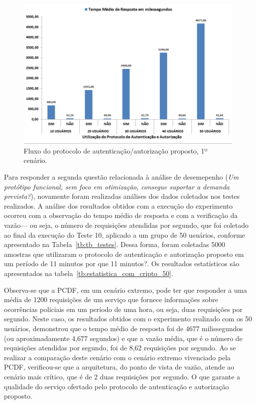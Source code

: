 \begin{figure}[!htb]
    \centering
    \includegraphics[width=1.0\textwidth]{grafico_teste_desempenho.png}
    \caption{Fluxo do protocolo de autenticação/autorização proposto, 1º cenário.}
    \label{fig:grafico_teste_desempenho}
\end{figure}

Para responder a segunda questão relacionada \`{a} an\'{a}lise de desemepenho (\emph{Um protótipo funcional, sem foco em otimização, consegue suportar a demanda prevista?}), 
novamente foram realizadas análises dos dados coletados nos testes realizados. A análise dos resultados obtidos com a execução do experimento ocorreu com a observação do tempo médio de resposta e com a verificação da vazão--- ou seja, o número de requisições atendidas por segundo, que foi coletado ao final da execução do Teste 10, aplicado a um grupo de 50 usuários, conforme apresentado na Tabela~\ref{tb:tb_testes}. Dessa forma, foram coletadas 5000 amostras que utilizaram o 
protocolo de autenticação e autorização proposto em um período de 11 minutos {\color{red}por que 11 minutos?}. Os resultados estatísticos são apresentados na tabela~\ref{tb:estatistica_com_cripto_50}.

Observa-se que a PCDF, em um cenário extremo, pode ter que responder a uma média de 1200 requisições de um serviço que fornece informações sobre ocorrências policiais em um período de uma hora, ou seja, duas requisições por segundo. Neste caso, os resultados obtidos com o experimento realizado com os 50 usuários, demonstrou que o tempo médio de resposta foi de 4677 milissegundos (ou aproximadamente 4,677 segundos) e que a vazão média, que é o número de requisições atendidas por segundo, foi de 8,62 requisições por segundo. Ao se realizar a comparação deste cenário com o cenário extremo vivenciado pela PCDF, verificou-se que a arquitetura, do ponto de vista de vazão, atende ao cen\'{a}rio mais cr\'{i}tico, 
que é de 2 duas requisições por segundo. O que garante a qualidade do serviço ofertado pelo protocolo de autenticação e autorização proposto.

